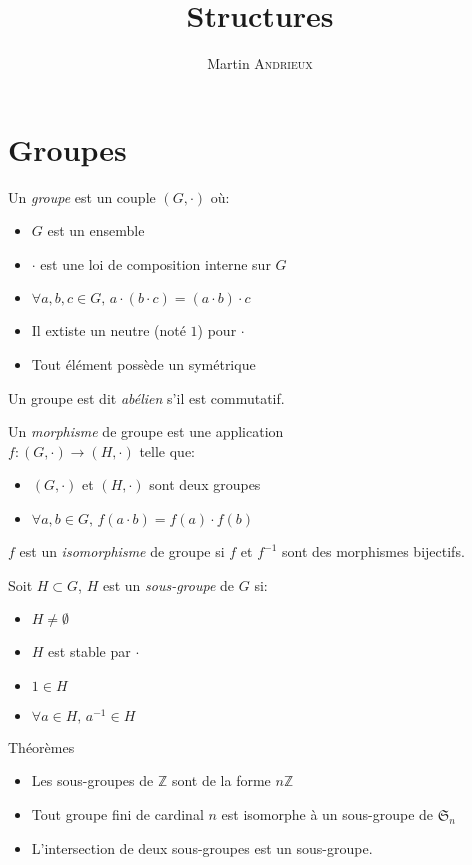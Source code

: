 \documentclass[french, a4paper, 11pt, twocolumn]{article}
\title{Structures}
\author{Martin \textsc{Andrieux}}
\date{}
\newcommand{\Z}{\mathbb{Z}}   %
\begin{document}
\maketitle

\section{Groupes}
\begin{definition}
  Un \emph{groupe} est un couple $(G,\cdot)$ où:
  \begin{itemize}[label=$\bullet$]
    \item $G$ est un ensemble
    \item $\cdot$ est une loi de composition interne sur $G$
    \item $\forall a,b,c \in G,\, a\cdot(b\cdot c) = (a\cdot b)\cdot c$
    \item Il extiste un neutre (noté $1$) pour $\cdot$
    \item Tout élément possède un symétrique
  \end{itemize}
  Un groupe est dit \emph{abélien} s'il est commutatif.
\end{definition}

\begin{definition}
  Un \emph{morphisme} de groupe est une application\\ $f:(G,\cdot)\rightarrow(H,\cdot)$ telle que:
  \begin{itemize}[label=$\bullet$]
    \item $(G,\cdot)$ et $(H,\cdot)$ sont deux groupes
    \item $\forall a,b\in G,\, f(a\cdot b) = f(a)\cdot f(b)$
  \end{itemize}
  $f$ est un \emph{isomorphisme} de groupe si $f$ et $f^{-1}$ sont des morphismes bijectifs.
\end{definition}

\begin{definition}
  Soit $H\subset G$, $H$ est un \emph{sous-groupe} de $G$ si:
  \begin{itemize}[label=$\bullet$]
    \item $H\neq\emptyset$
    \item $H$ est stable par $\cdot$
    \item $1\in H$
    \item $\forall a \in H,\, a^{-1}\in H$
  \end{itemize}
\end{definition}

\begin{theoreme}{Théorèmes}
  \begin{itemize}[label=$\bullet$]
    \item Les sous-groupes de $\Z$ sont de la forme $n\Z$
    \item Tout groupe fini de cardinal $n$ est isomorphe à un sous-groupe de $\mathfrak S_{n}$
    \item L'intersection de deux sous-groupes est un sous-groupe.
  \end{itemize}
\end{theoreme}
\end{document}
